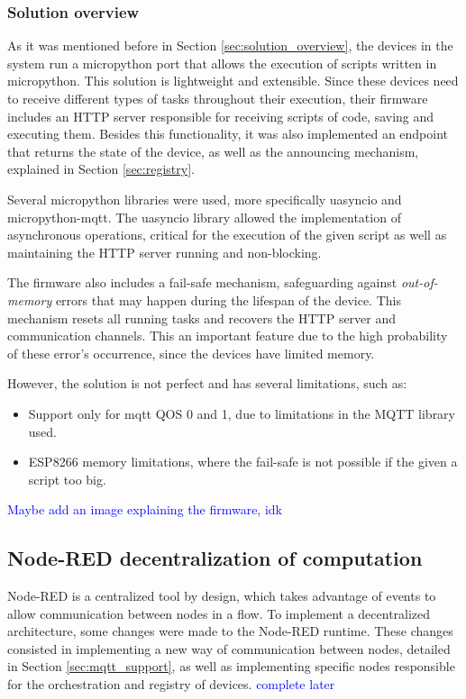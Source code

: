 \subsubsection{Solution overview}

As it was mentioned before in Section \ref{sec:solution_overview}, the devices in the system run a micropython port that allows the execution of scripts written in micropython. This solution is lightweight and extensible. Since these devices need to receive different types of tasks throughout their execution, their firmware includes an HTTP server responsible for receiving scripts of code, saving and executing them. Besides this functionality, it was also implemented an endpoint that returns the state of the device, as well as the announcing mechanism, explained in Section \ref{sec:registry}.

Several micropython libraries were used, more specifically uasyncio and micropython-mqtt. The uasyncio library allowed the implementation of asynchronous operations, critical for the execution of the given script as well as maintaining the HTTP server running and non-blocking.

The firmware also includes a fail-safe mechanism, safeguarding against \textit{out-of-memory} errors that may happen during the lifespan of the device. This mechanism resets all running tasks and recovers the HTTP server and communication channels. This an important feature due to the high probability of these error's occurrence, since the devices have limited memory. 

However, the solution is not perfect and has several limitations, such as:

\begin{itemize}
    \item Support only for mqtt QOS 0 and 1, due to limitations in the MQTT library used. 
    \item ESP8266 memory limitations, where the fail-safe is not possible if the given a script too big.
\end{itemize}

\textcolor{blue}{Maybe add an image explaining the firmware, idk}

\subsection{Node-RED decentralization of computation}\label{sec:node_red_decentralization}

Node-RED is a centralized tool by design, which takes advantage of events to allow communication between nodes in a flow. To implement a decentralized architecture, some changes were made to the Node-RED runtime. These changes consisted in implementing a new way of communication between nodes, detailed in Section \ref{sec:mqtt_support}, as well as implementing specific nodes responsible for the orchestration and registry of devices. \textcolor{blue}{complete later}

